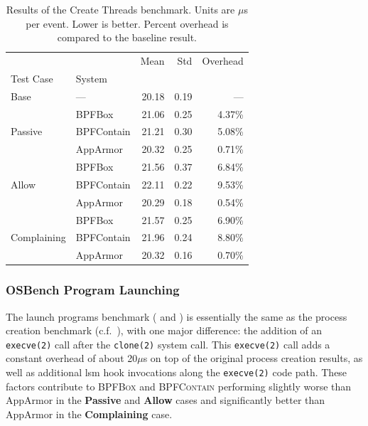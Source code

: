 \documentclass[
  fontsize=12pt,
  titlepage=firstiscover,
  paper=letter,
oneside,
  cleardoublepage=plain,
  parskip=half-,
  DIV=10,
  parindent,
  appendixprefix,
  chapterprefix,
  listof=totoc,
]{scrbook}
\newcommand{\bpfbox}{\textsc{BPFBox}}
\newcommand{\bpfcontain}{\textsc{BPFContain}}
\begin{document}
\begin{table}[ht!]
\centering
\footnotesize
\caption[Results of the Create Threads benchmark]{Results of the Create Threads benchmark. Units are $\mu$s per event. Lower is better. Percent overhead is compared to the baseline result.}
\label{tab:phoronix-create-threads}
\begin{tabular}{llrrr}
\toprule
            &          &   Mean &   Std & Overhead \\
Test Case & System &        &       &          \\
\midrule
Base & --- &  20.18 &  0.19 &      --- \\
\cline{1-5}
\multirow{3}{*}{Passive} & BPFBox &  21.06 &  0.25 &   4.37\% \\
            & BPFContain &  21.21 &  0.30 &   5.08\% \\
            & AppArmor &  20.32 &  0.25 &   0.71\% \\
\cline{1-5}
\multirow{3}{*}{Allow} & BPFBox &  21.56 &  0.37 &   6.84\% \\
            & BPFContain &  22.11 &  0.22 &   9.53\% \\
            & AppArmor &  20.29 &  0.18 &   0.54\% \\
\cline{1-5}
\multirow{3}{*}{Complaining} & BPFBox &  21.57 &  0.25 &   6.90\% \\
            & BPFContain &  21.96 &  0.24 &   8.80\% \\
            & AppArmor &  20.32 &  0.16 &   0.70\% \\
\bottomrule
\end{tabular}
\end{table}
 

\subsubsection{OSBench Program Launching}

The launch programs benchmark ( and ) is essentially the
same as the process creation benchmark (c.f.\ ), with one
major difference: the addition of an \texttt{execve(2)} call after the \texttt{clone(2)}
system call. This \texttt{execve(2)} call adds a constant overhead of about 20$\mu$s on
top of the original process creation results, as well as additional \gls{lsm} hook
invocations along the \texttt{execve(2)} code path. These factors contribute to \bpfbox{}
and \bpfcontain{} performing slightly worse than AppArmor in the \textbf{Passive} and
\textbf{Allow} cases and significantly better than AppArmor in the \textbf{Complaining}
case.
\end{document}
